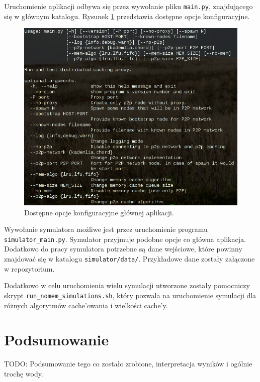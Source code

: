 \documentclass[a4paper,11pt]{scrartcl}
\newcommand{\f}{\texttt}
\newcommand{\s}{ }
\newcommand{\keszy}{cache'y}
\newcommand{\keszowania}{cache'owania}
\begin{document}
Uruchomienie aplikacji odbywa się przez wywołanie pliku \f{main.py}, znajdującego się w głównym katalogu. Rysunek \ref{fig_main_help} przedstawia dostępne opcje konfiguracyjne.

\begin{figure}[h]
\centering
\includegraphics[width=0.8\linewidth]{img/options.png}
\caption{Dostępne opcje konfiguracyjne głównej aplikacji.}
\label{fig_main_help}
\end{figure}

Wywołanie symulatora możliwe jest przez uruchomienie programu \f{simulator\_main.py}. Symulator przyjmuje podobne opcje co główna aplikacja. Dodatkowo do pracy symulatora potrzebne są dane wejściowe, które powinny znajdować się w katalogu \f{simulator/data/}. Przykładowe dane zostały załączone w repozytorium.

Dodatkowo w celu uruchomienia wielu symulacji utworzone zostały pomocniczy skrypt \f{run\_nomem\_simulations.sh}, który pozwala na uruchomienie symulacji dla różnych algorytmów \keszowania\s i wielkości \keszy.


\section{Podsumowanie}

TODO: Podsumowanie tego co zostało zrobione, interpretacja wyników i ogólnie trochę wody.




\end{document}
